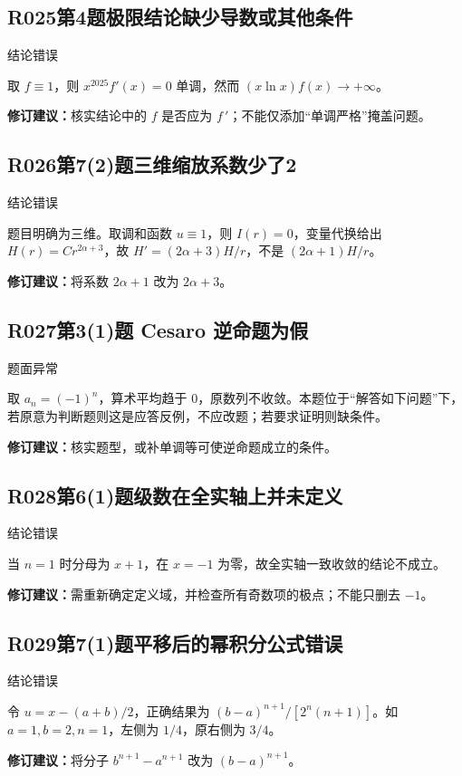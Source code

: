 \subsection*{R025\quad 第4题极限结论缺少导数或其他条件}
\noindent{}\quad 结论错误\par
取 $f\equiv1$，则 $x^{2025}f'(x)=0$ 单调，然而 $(x\ln x)f(x)\to+\infty$。
\par\textbf{修订建议：}核实结论中的 $f$ 是否应为 $f\,\prime$；不能仅添加“单调严格”掩盖问题。\par
{}
\subsection*{R026\quad 第7(2)题三维缩放系数少了2}
\noindent{}\quad 结论错误\par
题目明确为三维。取调和函数 $u\equiv1$，则 $I(r)=0$，变量代换给出 $H(r)=C r^{2\alpha+3}$，故 $H'=(2\alpha+3)H/r$，不是 $(2\alpha+1)H/r$。
\par\textbf{修订建议：}将系数 $2\alpha+1$ 改为 $2\alpha+3$。\par
{}
\subsection*{R027\quad 第3(1)题 Cesaro 逆命题为假}
\noindent{}\quad 题面异常\par
取 $a_n=(-1)^n$，算术平均趋于 $0$，原数列不收敛。本题位于“解答如下问题”下，若原意为判断题则这是应答反例，不应改题；若要求证明则缺条件。
\par\textbf{修订建议：}核实题型，或补单调等可使逆命题成立的条件。\par
{}
\subsection*{R028\quad 第6(1)题级数在全实轴上并未定义}
\noindent{}\quad 结论错误\par
当 $n=1$ 时分母为 $x+1$，在 $x=-1$ 为零，故全实轴一致收敛的结论不成立。
\par\textbf{修订建议：}需重新确定定义域，并检查所有奇数项的极点；不能只删去 $-1$。\par
{}
\subsection*{R029\quad 第7(1)题平移后的幂积分公式错误}
\noindent{}\quad 结论错误\par
令 $u=x-(a+b)/2$，正确结果为 $(b-a)^{n+1}/[2^n(n+1)]$。如 $a=1,b=2,n=1$，左侧为 $1/4$，原右侧为 $3/4$。
\par\textbf{修订建议：}将分子 $b^{n+1}-a^{n+1}$ 改为 $(b-a)^{n+1}$。\par
{}
